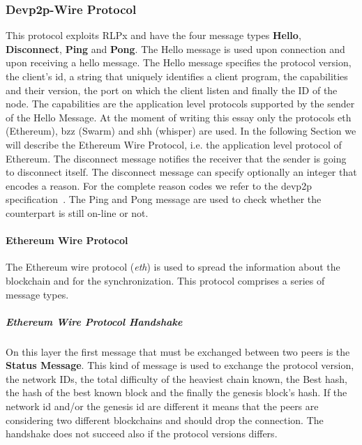 \subsubsection{Devp2p-Wire Protocol}

This protocol exploits RLPx and have the four message types
\textbf{Hello}, \textbf{Disconnect}, \textbf{Ping} and \textbf{Pong}.
The Hello message is used upon connection and upon receiving a hello message.
The Hello message specifies the protocol version, the client's id,
a string that uniquely identifies a client program, the capabilities and their
version, the port on which the client listen and finally the ID of the node.
The capabilities are the application level protocols supported by the sender
of the Hello Message. At the moment of writing this essay only the protocols
eth (Ethereum), bzz (Swarm) and shh (whisper) are used. In the following
Section we will describe the Ethereum Wire Protocol, i.e. the application
level protocol of Ethereum.
The disconnect message notifies the receiver that the sender is going to
disconnect itself. The disconnect message can specify optionally an
integer that encodes a reason.
For the complete reason codes we refer to the devp2p specification~\cite{}.
The Ping and Pong message are used to check whether the counterpart is still
on-line or not.

\paragraph{Ethereum Wire Protocol}
The Ethereum wire protocol (\textit{eth}) is used to spread the information
about the blockchain and for the synchronization. 
This protocol comprises a series of message types. 

\subparagraph{Ethereum Wire Protocol Handshake}

On this layer the first message that must be exchanged between two peers
is the \textbf{Status Message}. This kind of message is used to exchange
the protocol version, the network IDs, the total difficulty of the
heaviest chain known, the Best hash, the hash of the best known block and the
finally the genesis block's hash. 
If the network id and/or the genesis id are different
it means that the peers are considering two different blockchains and
should drop the connection. The handshake does not succeed also if the
protocol versions differs.

